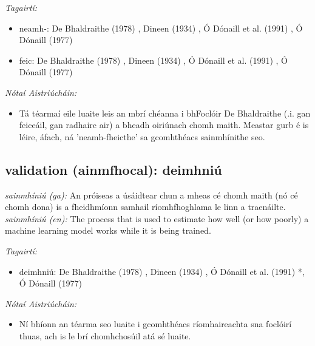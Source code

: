 \documentclass{article}
\begin{document}
 \noindent \textit{Tagairtí:}
\begin{itemize}
	\item neamh-: De Bhaldraithe (1978) \cite{de-bhaldraithe}, Dineen (1934) \cite{dineen}, Ó Dónaill et al. (1991) \cite{focloir-beag}, Ó Dónaill (1977) \cite{odonaill}
	\item feic: De Bhaldraithe (1978) \cite{de-bhaldraithe}, Dineen (1934) \cite{dineen}, Ó Dónaill et al. (1991) \cite{focloir-beag}, Ó Dónaill (1977) \cite{odonaill}
\end{itemize}

 \noindent \textit{Nótaí Aistriúcháin:}
\begin{itemize}
	\item Tá téarmaí eile luaite leis an mbrí chéanna i bhFoclóir De Bhaldraithe (.i. gan feiceáil, gan radhairc air) a bheadh oiriúnach chomh maith. Meastar gurb é is léire, áfach, ná 'neamh-fheicthe' sa gcomhthéacs sainmhínithe seo.
\end{itemize}


\subsection*{validation (ainmfhocal): deimhniú} 
 \noindent \textit{sainmhíniú (ga):} An próiseas a úsáidtear chun a mheas cé chomh maith (nó cé chomh dona) is a fheidhmíonn samhail ríomhfhoghlama le linn a traenáilte.
\newline\newline
 \noindent \textit{sainmhíniú (en):} The process that is used to estimate how well (or how poorly) a machine learning model works while it is being trained.
\newline

 \noindent \textit{Tagairtí:}
\begin{itemize}
	\item deimhniú: De Bhaldraithe (1978) \cite{de-bhaldraithe}, Dineen (1934) \cite{dineen}, Ó Dónaill et al. (1991) \cite{focloir-beag}*, Ó Dónaill (1977) \cite{odonaill}
\end{itemize}

 \noindent \textit{Nótaí Aistriúcháin:}
\begin{itemize}
	\item Ní bhíonn an téarma seo luaite i gcomhthéacs ríomhaireachta sna foclóirí thuas, ach is le brí chomhchosúil atá sé luaite.
\end{itemize}
\end{document}
